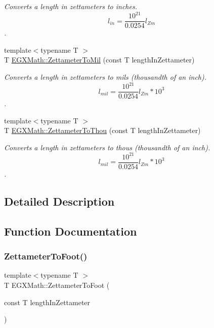 \begin{DoxyCompactItemize}
\begin{DoxyCompactList}\small\item\em Converts a length in zettameters to inches. \[ l_{in}= \frac{10^{21}}{0.0254} l_{Zm} \]. \end{DoxyCompactList}\item 
{\footnotesize template$<$typename T $>$ }\\T \mbox{\hyperlink{group___e_g_x_math-_conversions-_length_conversions-_s_i-_zettameter-_imperial_gad42b99391f53e56136f2411915c5e28d}{E\+G\+X\+Math\+::\+Zettameter\+To\+Mil}} (const T length\+In\+Zettameter)
\begin{DoxyCompactList}\small\item\em Converts a length in zettameters to mils (thousandth of an inch). \[ l_{mil}= \frac{10^{21}}{0.0254} l_{Zm} * 10^{3} \]. \end{DoxyCompactList}\item 
{\footnotesize template$<$typename T $>$ }\\T \mbox{\hyperlink{group___e_g_x_math-_conversions-_length_conversions-_s_i-_zettameter-_imperial_gacd92ac6ab3300ca582966510e369a381}{E\+G\+X\+Math\+::\+Zettameter\+To\+Thou}} (const T length\+In\+Zettameter)
\begin{DoxyCompactList}\small\item\em Converts a length in zettameters to thous (thousandth of an inch). \[ l_{mil}= \frac{10^{21}}{0.0254} l_{Zm} * 10^{3} \]. \end{DoxyCompactList}\end{DoxyCompactItemize}


\subsection{Detailed Description}


\subsection{Function Documentation}
\mbox{\label{group___e_g_x_math-_conversions-_length_conversions-_s_i-_zettameter-_imperial_ga2b64ad3efd85a1800a76661d05487a09}} 
\subsubsection{\texorpdfstring{Zettameter\+To\+Foot()}{ZettameterToFoot()}}
{\footnotesize\ttfamily template$<$typename T $>$ \\
T E\+G\+X\+Math\+::\+Zettameter\+To\+Foot (\begin{DoxyParamCaption}\item[{const T}]{length\+In\+Zettameter }\end{DoxyParamCaption})}



